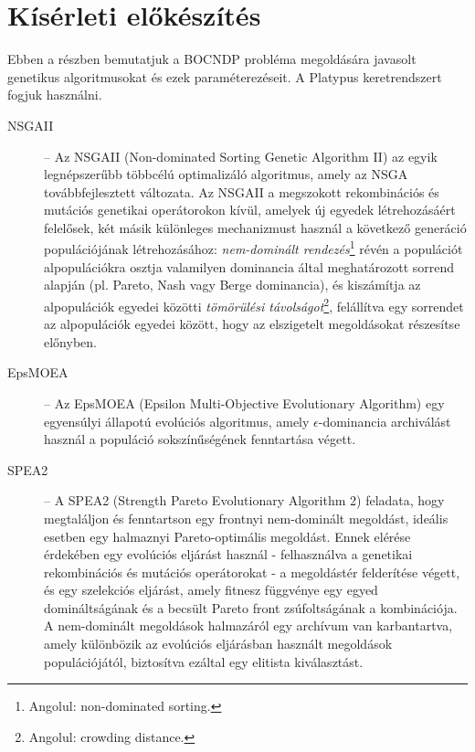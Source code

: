 \section{Kísérleti előkészítés}

Ebben a részben bemutatjuk a BOCNDP probléma megoldására javasolt genetikus algoritmusokat és ezek paraméterezéseit.
A Platypus keretrendszert \cite{hadka2017platypus} fogjuk használni.

\begin{description}
      \item[NSGAII] -- Az NSGAII (Non-dominated Sorting Genetic Algorithm II) \cite{ventresca2018bi} az egyik legnépszerűbb többcélú optimalizáló algoritmus,
            amely az NSGA továbbfejlesztett változata. Az NSGAII a megszokott rekombinációs és mutációs genetikai operátorokon kívül,
            amelyek új egyedek létrehozásáért felelősek, két másik különleges mechanizmust használ a következő generáció populációjának létrehozásához:
            \textit{nem-dominált rendezés}\footnote{ Angolul: non-dominated sorting. } révén a populációt alpopulációkra
            osztja valamilyen dominancia által meghatározott sorrend alapján (pl. Pareto, Nash vagy Berge dominancia),
            és kiszámítja az alpopulációk egyedei közötti \textit{tömörülési távolságot}\footnote{ Angolul: crowding distance. },
            felállítva egy sorrendet az alpopulációk egyedei között, hogy az elszigetelt megoldásokat részesítse előnyben.
      \item[EpsMOEA] -- Az EpsMOEA (Epsilon Multi-Objective Evolutionary Algorithm) \cite{ventresca2018bi} egy egyensúlyi állapotú evolúciós algoritmus,
            amely $\epsilon$-dominancia archiválást használ a populáció sokszínűségének fenntartása végett.
      \item[SPEA2] -- A SPEA2 (Strength Pareto Evolutionary Algorithm 2) \cite{brownlee2011clever} feladata, hogy megtaláljon és fenntartson egy frontnyi nem-dominált megoldást,
            ideális esetben egy halmaznyi Pareto-optimális megoldást. Ennek elérése érdekében egy evolúciós eljárást használ
            - felhasználva a genetikai rekombinációs és mutációs operátorokat - a megoldástér felderítése végett,
            és egy szelekciós eljárást, amely fitnesz függvénye egy egyed domináltságának és a becsült Pareto front zsúfoltságának a kombinációja.
            A nem-dominált megoldások halmazáról egy archívum van karbantartva, amely különbözik az evolúciós eljárásban használt megoldások populációjától,
            biztosítva ezáltal egy elitista kiválasztást.

\end{description}
